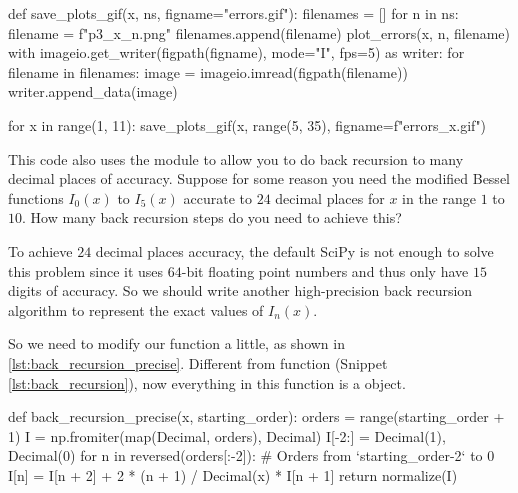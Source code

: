 \begin{algorithm}[H]
    \caption{}
    \label{lst:gif}
    \begin{pythoncode}
        def save_plots_gif(x, ns, figname="errors.gif"):
            filenames = []
            for n in ns:
                filename = f"p3_{x}_{n}.png"
                filenames.append(filename)
                plot_errors(x, n, filename)
            with imageio.get_writer(figpath(figname), mode="I", fps=5) as writer:
                for filename in filenames:
                    image = imageio.imread(figpath(filename))
                    writer.append_data(image)

        for x in range(1, 11):
            save_plots_gif(x, range(5, 35), figname=f"errors_{x}.gif")
        \end{pythoncode}
\end{algorithm}

\Question This code also uses the  module to allow you to do back recursion to many
decimal places of accuracy. Suppose for some reason you need the modified Bessel functions
$I_0(x)$ to $I_5(x)$ accurate to $24$ decimal places for $x$ in the range $1$ to $10$. How
many back recursion steps do you need to achieve this?

\Answer To achieve $24$ decimal places accuracy, the default SciPy 
is not enough to solve this problem since it uses $64$-bit floating point numbers
and thus only have $15$ digits of accuracy.
So we should write another high-precision back recursion algorithm to represent the exact
values of $I_n(x)$.

So we need to modify our  function a little, as shown in
\ref{lst:back_recursion_precise}. Different from function 
(Snippet \ref{lst:back_recursion}), now everything in this function is a 
object.

\begin{algorithm}[H]
    \caption{}
    \label{lst:back_recursion_precise}
    \begin{pythoncode}
        def back_recursion_precise(x, starting_order):
            orders = range(starting_order + 1)
            I = np.fromiter(map(Decimal, orders), Decimal)
            I[-2:] = Decimal(1), Decimal(0)
            for n in reversed(orders[:-2]):  # Orders from `starting_order-2` to 0
                I[n] = I[n + 2] + 2 * (n + 1) / Decimal(x) * I[n + 1]
            return normalize(I)
        \end{pythoncode}
\end{algorithm}

